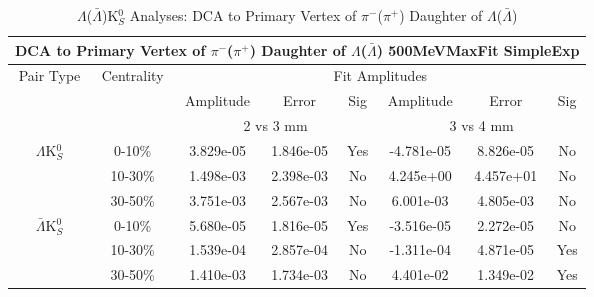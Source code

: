 \documentclass[../AnalysisNoteJBuxton.tex]{subfiles}
\begin{document}
\begin{table}
 \centering
 \begin{tabular}{|c|c|c|c|c||c|c|c|}
  \multicolumn{8}{c}{DCA to Primary Vertex of $\pi^{-}$($\pi^{+}$) Daughter of $\Lambda$($\bar{\Lambda}$) 500MeVMaxFit SimpleExp} \\
  \hline
  \multirow{3}{*}{Pair Type} & \multirow{3}{*}{Centrality} & \multicolumn{6}{c|}{Fit Amplitudes} \\
  \cline{3-8}
   & & Amplitude & Error & Sig & Amplitude & Error & Sig \\  
  \cline{3-8}
   & & \multicolumn{3}{c||}{2 vs 3 mm} & \multicolumn{3}{c|}{3 vs 4 mm} \\  
  \hline  
  \multirow{3}{*}{$\Lambda$K$^{0}_{S}$}  
   &  0-10\% & 3.829e-05 & 1.846e-05 & Yes & -4.781e-05 & 8.826e-05 & No \\
   & 10-30\% & 1.498e-03 & 2.398e-03 & No & 4.245e+00 & 4.457e+01 & No \\
   & 30-50\% & 3.751e-03 & 2.567e-03 & No & 6.001e-03 & 4.805e-03 & No \\
  \hline  
  \multirow{3}{*}{$\bar{\Lambda}$K$^{0}_{S}$}  
   &  0-10\% & 5.680e-05 & 1.816e-05 & Yes & -3.516e-05 & 2.272e-05 & No \\
   & 10-30\% & 1.539e-04 & 2.857e-04 & No & -1.311e-04 & 4.871e-05 & Yes \\
   & 30-50\% & 1.410e-03 & 1.734e-03 & No & 4.401e-02 & 1.349e-02 & Yes \\
  \hline
 \end{tabular}
 \caption{$\Lambda$($\bar{\Lambda}$)K$^{0}_{S}$ Analyses: DCA to Primary Vertex of $\pi^{-}$($\pi^{+}$) Daughter of $\Lambda$($\bar{\Lambda}$)}
 \label{tab:DcaToPrimVertexPionDaughtOfLamLamK0_500MeVMaxFit_SimpleExp}
\end{table}



\end{document}
